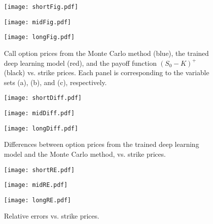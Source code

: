 \begin{figure}[H]
    \begin{minipage}{0.5\hsize}\texttt{[image: shortFig.pdf]}\subcaption{}\end{minipage}
    \begin{minipage}{0.5\hsize}\texttt{[image: midFig.pdf]}\subcaption{}\end{minipage}
    \begin{center}\begin{minipage}{0.5\hsize}\texttt{[image: longFig.pdf]}\subcaption{}\end{minipage}\end{center}
\caption{Call option prices from the Monte Carlo method (blue), the trained deep learning model (red),
and the payoff function $(S_0-K)^+$ (black) vs. strike prices.
Each panel is corresponding to the variable sets (a), (b), and (c), respectively.}\label{fig1}
\end{figure}

\begin{figure}[H]
    \begin{minipage}{0.5\hsize}\texttt{[image: shortDiff.pdf]}\subcaption{}\end{minipage}
    \begin{minipage}{0.5\hsize}\texttt{[image: midDiff.pdf]}\subcaption{}\end{minipage}
    \begin{center}\begin{minipage}{0.5\hsize}\texttt{[image: longDiff.pdf]}\subcaption{}\end{minipage}\end{center}
\caption{Differences between option prices from the trained deep learning model and the Monte Carlo method, vs. strike prices.}\label{fig2}
\end{figure}

\begin{figure}[H]
    \begin{minipage}{0.5\hsize}\texttt{[image: shortRE.pdf]}\subcaption{}\end{minipage}
    \begin{minipage}{0.5\hsize}\texttt{[image: midRE.pdf]}\subcaption{}\end{minipage}
    \begin{center}\begin{minipage}{0.5\hsize}\texttt{[image: longRE.pdf]}\subcaption{}\end{minipage}\end{center}
\caption{Relative errors vs. strike prices.}\label{fig3}
\end{figure}

